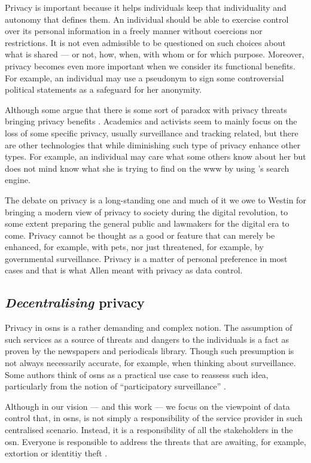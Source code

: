 Privacy is important because it helps individuals keep that individuality and autonomy 
that defines them. An individual should be able to exercise control over its personal 
information in a freely manner without coercions nor restrictions. It is not even 
admissible to be questioned on such choices about what is shared --- or not, how, 
when, with whom or for which purpose. Moreover, privacy becomes even more important 
when we consider its functional benefits. For example, an individual may use a pseudonym 
to sign some controversial political statements as a safeguard for her anonymity.

Although some argue that there is some sort of paradox with privacy threats bringing 
privacy benefits \cite{WittesL15}. Academics and activists seem to mainly focus 
on the loss of some specific privacy, usually surveillance and tracking related, 
but there are other technologies that while diminishing such type of privacy enhance 
other types. For example, an individual may care what some others know about her 
but does not mind \Google know what she is trying to find on the \ac{www} by using 
\Google's search engine.

The debate on privacy is a long-standing one and much of it we owe to Westin for 
bringing a modern view of privacy to society during the digital revolution, to some 
extent preparing the general public and lawmakers for the digital era to come. Privacy 
cannot be thought as a good or feature that can merely be enhanced, for example, 
with \acp{pet}, nor just threatened, for example, by governmental surveillance. 
Privacy is a matter of personal preference in most cases and that is what Allen 
meant with privacy as data control.

\subsection{\emph{Decentralising} privacy}
    \label{subsection:thesis:decentralising-privacy}
Privacy in \acp{osn} is a rather demanding and complex notion. The assumption of 
such services as a source of threats and dangers to the individuals is a fact as 
proven by the newspapers and periodicals library. Though such presumption is not 
always necessarily accurate, for example, when thinking about surveillance. Some 
authors think of \acp{osn} as a practical use case to reassess such idea, particularly 
from the notion of ``participatory surveillance'' \cite{Albrechtslund08}.

Although in our vision --- and this work --- we focus on the viewpoint of data control 
that, in \acp{osn}, is not simply a responsibility of the service provider in such 
centralised scenario. Instead, it is a responsibility of all the stakeholders in 
the \ac{osn}. Everyone is responsible to address the threats that are awaiting, 
for example, extortion or identitiy theft \cite{GrossAH05}. 

